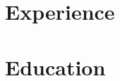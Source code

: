 \documentclass[letter,10pt]{article}
\begin{document}
%

%

\section{Experience}


\section{Education}



%
\end{document}
